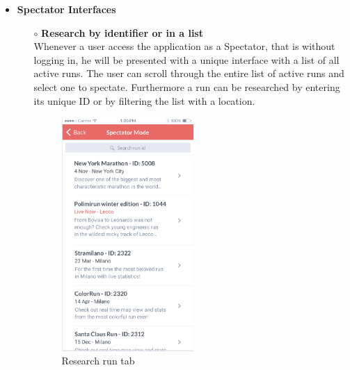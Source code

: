\documentclass[titlepage]{article}
\begin{document}
\begin{itemize}
\begin{itemize}
\begin{itemize}
				\end{itemize}
				\item{\bf Spectator Interfaces} 
				\begin{itemize}
					\item[$\circ$] {\bf Research by identifier or in a list} \\
					Whenever a user access the application as a Spectator, that is without logging in, he will be presented with a unique interface with a list of all active runs. The user can scroll through the entire list of active runs and select one to spectate. Furthermore a run can be researched by entering its unique ID or by filtering the list with a location.\\
					\begin{figure}[H]
						\center
  						\includegraphics[width=5cm]{Mockup/mockupResearch.png}
  						\caption{Research run tab}
 					 	\label{fig:Research}
					\end{figure}


\end{itemize}
\end{itemize}
\end{itemize}
\end{document}
